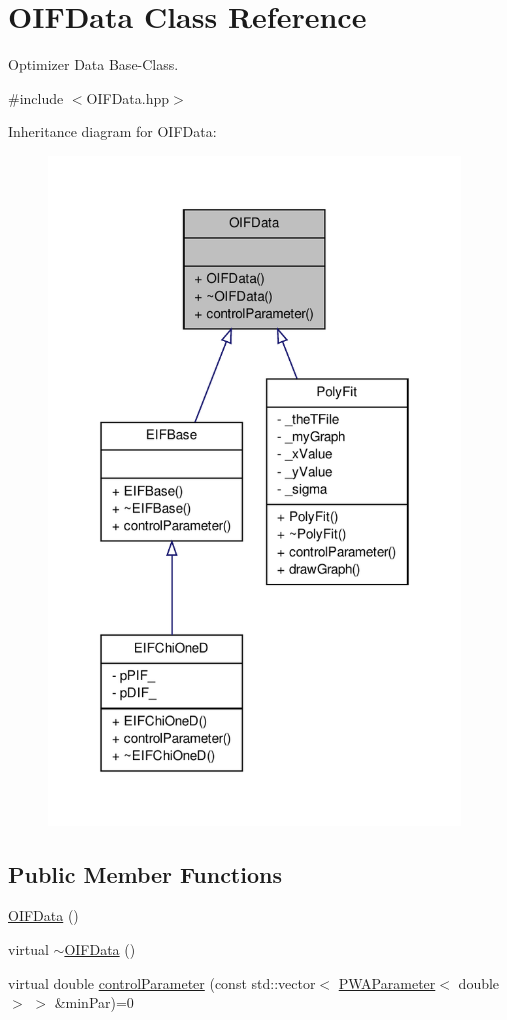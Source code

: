\hypertarget{classOIFData}{
\section{OIFData Class Reference}
\label{d1/d4f/classOIFData}
}


Optimizer Data Base-\/Class.  




{\ttfamily \#include $<$OIFData.hpp$>$}



Inheritance diagram for OIFData:\nopagebreak
\begin{figure}[H]
\begin{center}
\leavevmode
\includegraphics[width=310pt]{d9/d48/classOIFData__inherit__graph}
\end{center}
\end{figure}
\subsection*{Public Member Functions}
\begin{DoxyCompactItemize}
\item 
\hyperlink{classOIFData_a11151212f0897c14c0b81b0b55939473}{OIFData} ()
\item 
virtual \hyperlink{classOIFData_ab7126c43d4911e022db3033996fc345c}{$\sim$OIFData} ()
\item 
virtual double \hyperlink{classOIFData_a12eef51d074a73b5b261c411e79cbb37}{controlParameter} (const std::vector$<$ \hyperlink{classPWAParameter}{PWAParameter}$<$ double $>$ $>$ \&minPar)=0
\end{DoxyCompactItemize}



